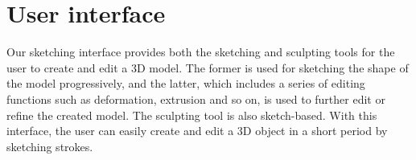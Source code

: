 %
%


\section{User interface}
\label{ch3:sec:ui}

Our sketching interface provides both the sketching and sculpting
tools for the user to create and edit a 3D model. The former is used
for sketching the shape of the model progressively, and the latter,
which includes a series of editing functions such as deformation,
extrusion and so on, is used to further edit or refine the created
model. The sculpting tool is also sketch-based. With this interface,
the user can easily create and edit a 3D object in a short period by
sketching strokes.

